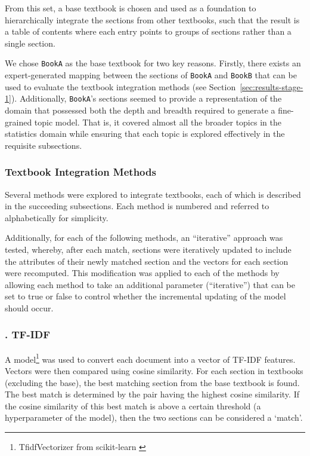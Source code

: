 \documentclass[twocolumn]{article}
\def\code#1{\texttt{#1}}
\newcounter{methodcounter}[section] %
\renewcommand{\themethodcounter}{\Alph{methodcounter}}
\newcommand{\method}[1]{
  \refstepcounter{methodcounter}
  \subsubsection*{\normalsize \themethodcounter. #1 \vspace{-0.5em}}
}
\begin{document}
From this set, a base textbook is chosen and used as a foundation to hierarchically integrate the sections from other textbooks, such that the result is a table of contents where each entry points to groups of sections rather than a single section.

We chose \code{BookA} as the base textbook for two key reasons. Firstly, there exists an expert-generated mapping between the sections of \code{BookA} and \code{BookB} that can be used to evaluate the textbook integration methods (see Section~\ref{sec:results-stage-1}). Additionally, \code{BookA}'s sections seemed to provide a representation of the domain that possessed both the depth and breadth required to generate a fine-grained topic model. That is, it covered almost all the broader topics in the statistics domain while ensuring that each topic is explored effectively in the requisite subsections.

\subsubsection{Textbook Integration Methods} \label{sec:content-linkage}
Several methods were explored to integrate textbooks, each of which is described in the succeeding subsections. Each method is numbered and referred to alphabetically for simplicity.

Additionally, for each of the following methods, an ``iterative'' approach was tested, whereby, after each match, sections were iteratively updated to include the attributes of their newly matched section and the vectors for each section were recomputed. This modification was applied to each of the methods by allowing each method to take an additional parameter (``iterative'') that can be set to true or false to control whether the incremental updating of the model should occur.


\method{TF-IDF}
A model\footnote{TfidfVectorizer from 
scikit-learn \cite{scikit-learn}} was used to convert each document into a vector of TF-IDF features. Vectors were then compared using cosine similarity. For each section in textbooks (excluding the base), the best matching section from the base textbook is found. The best match is determined by the pair having the highest cosine similarity. If the cosine similarity of this best match is above a certain threshold (a hyperparameter of the model), then the two sections can be considered a `match'.
\end{document}
